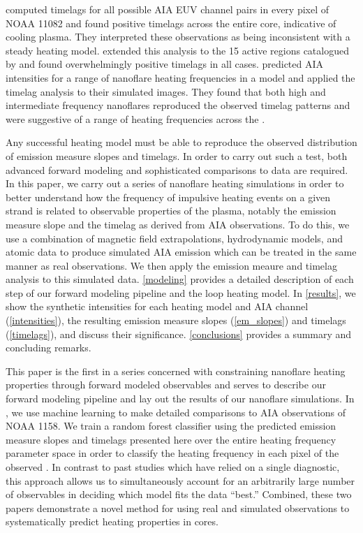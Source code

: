 \citeauthor{viall_evidence_2012} computed timelags for all possible AIA EUV channel pairs in every pixel of \AR{} NOAA 11082 and found positive timelags across the entire \AR{} core, indicative of cooling plasma. They interpreted these observations as being inconsistent with a steady heating model. \citet{viall_survey_2017} extended this analysis to the 15 active regions catalogued by \citet{warren_systematic_2012} and found overwhelmingly positive timelags in all cases. \citet{bradshaw_patterns_2016} predicted AIA intensities for a range of nanoflare heating frequencies in a model \AR{} and applied the timelag analysis to their simulated images. They found that both high and intermediate frequency nanoflares reproduced the observed timelag patterns and were suggestive of a range of heating frequencies across the \AR{}.

Any successful heating model must be able to reproduce the observed distribution of emission measure slopes and timelags. In order to carry out such a test, both advanced forward modeling and sophisticated comparisons to data are required. In this paper, we carry out a series of nanoflare heating simulations in order to better understand how the frequency of impulsive heating events on a given strand is related to observable properties of the plasma, notably the emission measure slope and the timelag as derived from AIA observations. To do this, we use a combination of magnetic field extrapolations, hydrodynamic models, and atomic data to produce simulated AIA emission which can be treated in the same manner as real observations. We then apply the emission meaure and timelag analysis to this simulated data. \autoref{modeling} provides a detailed description of each step of our forward modeling pipeline and the loop heating model. In \autoref{results}, we show the synthetic intensities for each heating model and AIA channel (\autoref{intensities}), the resulting emission measure slopes (\autoref{em_slopes}) and timelags (\autoref{timelags}), and discuss their significance. \autoref{conclusions} provides a summary and concluding remarks.

This paper is the first in a series concerned with constraining nanoflare heating properties through forward modeled observables and serves to describe our forward modeling pipeline and lay out the results of our nanoflare simulations. In \citet[ hereafter]{barnes_understanding_2019-1}, we use machine learning to make detailed comparisons to AIA observations of \AR{} NOAA 1158. We train a random forest classifier using the predicted emission measure slopes and timelags presented here over the entire heating frequency parameter space in order to classify the heating frequency in each pixel of the observed \AR{}. In contrast to past studies which have relied on a single diagnostic, this approach allows us to simultaneously account for an arbitrarily large number of observables in deciding which model fits the data ``best.'' Combined, these two papers demonstrate a novel method for using real and simulated observations to systematically predict heating properties in \AR{} cores.
